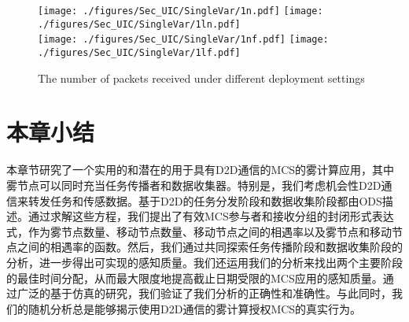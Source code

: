 \begin{figure}[!h]
  \centering
	{\texttt{[image: ./figures/Sec\_UIC/SingleVar/1n.pdf]}}
	{\texttt{[image: ./figures/Sec\_UIC/SingleVar/1ln.pdf]}}\\
	{\texttt{[image: ./figures/Sec\_UIC/SingleVar/1nf.pdf]}}
	{\texttt{[image: ./figures/Sec\_UIC/SingleVar/1lf.pdf]}}
	\vspace{-1em}
	\caption{The number of packets received under different deployment settings}
	\label{Figure_SingleValTest}
\end{figure}

\section{本章小结}

本章节研究了一个实用的和潜在的用于具有D2D通信的MCS的雾计算应用，其中雾节点可以同时充当任务传播者和数据收集器。特别是，我们考虑机会性D2D通信来转发任务和传感数据。基于D2D的任务分发阶段和数据收集阶段都由ODS描述。通过求解这些方程，我们提出了有效MCS参与者和接收分组的封闭形式表达式，作为雾节点数量、移动节点数量、移动节点之间的相遇率以及雾节点和移动节点之间的相遇率的函数。然后，我们通过共同探索任务传播阶段和数据收集阶段的分析，进一步得出可实现的感知质量。我们还运用我们的分析来找出两个主要阶段的最佳时间分配，从而最大限度地提高截止日期受限的MCS应用的感知质量。通过广泛的基于仿真的研究，我们验证了我们分析的正确性和准确性。与此同时，我们的随机分析总是能够揭示使用D2D通信的雾计算授权MCS的真实行为。